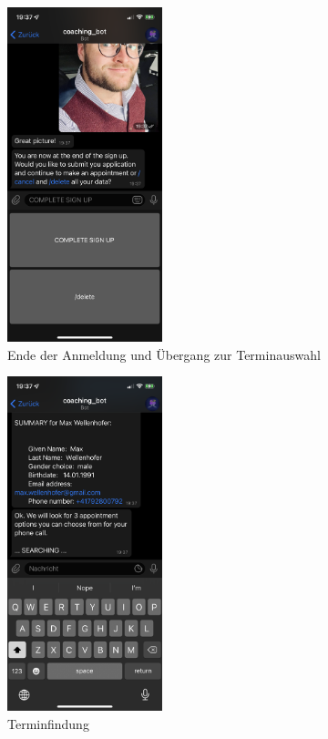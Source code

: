 	\begin{figure}
		\centering
		\includegraphics[width=0.4\textwidth]{images/Screenshots/complete-sign-up.PNG}
		\caption{Ende der Anmeldung und Übergang zur Terminauswahl}
		\label{fig: scs..complete-sign-up}
	\end{figure}


	\begin{figure}
		\centering
		\includegraphics[width=0.4\textwidth]{images/Screenshots/slot-search.PNG}
		\caption{Terminfindung}
		\label{fig: scs..slot-search}
	\end{figure}


